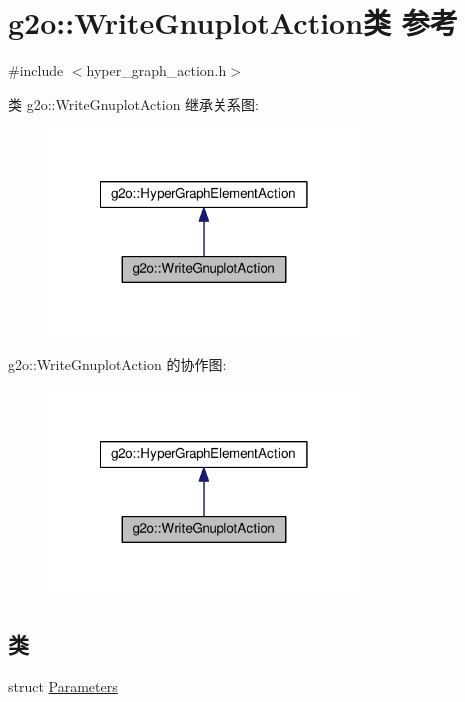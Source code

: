 \hypertarget{classg2o_1_1WriteGnuplotAction}{\section{g2o\-:\-:Write\-Gnuplot\-Action类 参考}
\label{classg2o_1_1WriteGnuplotAction}
}


{\ttfamily \#include $<$hyper\-\_\-graph\-\_\-action.\-h$>$}



类 g2o\-:\-:Write\-Gnuplot\-Action 继承关系图\-:
\nopagebreak
\begin{figure}[H]
\begin{center}
\leavevmode
\includegraphics[width=234pt]{classg2o_1_1WriteGnuplotAction__inherit__graph}
\end{center}
\end{figure}


g2o\-:\-:Write\-Gnuplot\-Action 的协作图\-:
\nopagebreak
\begin{figure}[H]
\begin{center}
\leavevmode
\includegraphics[width=234pt]{classg2o_1_1WriteGnuplotAction__coll__graph}
\end{center}
\end{figure}
\subsection*{类}
\begin{DoxyCompactItemize}
\item 
struct \hyperlink{structg2o_1_1WriteGnuplotAction_1_1Parameters}{Parameters}
\end{DoxyCompactItemize}
